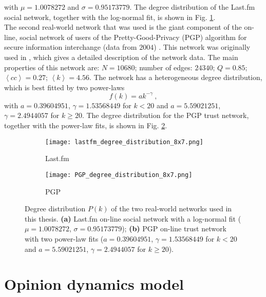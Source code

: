 \documentclass[11 pt , letterpaper , twoside , openright]{book}
\begin{document}
with $\mu = 1.0078272$ and $\sigma = 0.95173779$. The degree distribution of the Last.fm social network, together with the log-normal fit, is shown in Fig. \ref{deg_distr_lastfm}.\\
\newline
The second real-world network that was used is the giant component of the on-line, social network of users of the Pretty-Good-Privacy (PGP) algorithm for secure information interchange (data from $2004$) \cite{ICON}. This network was originally used in \cite{Boguna2004}, which gives a detailed description of the network data. The main properties of this network are: $N = 10680$; number of edges: $24340$; $Q = 0.85$; $\left<cc\right> = 0.27$; $\left<k\right> = 4.56$. The network has a heterogeneous degree distribution, which is best fitted by two power-laws
\begin{equation}
 f(k) = a k^{-\gamma} \ ,
\end{equation}
with $a = 0.39604951$, $\gamma = 1.53568449$ for $k < 20$ and $a = 5.59021251$, $\gamma = 2.4944057$ for $k \geqslant 20$. The degree distribution for the PGP trust network, together with the power-law fits, is shown in Fig. \ref{deg_distr_pgp}. 

\begin{figure}[H]
  \begin{subfigure}[b]{0.49\textwidth}
    \caption{Last.fm}
    \texttt{[image: lastfm\_degree\_distribution\_8x7.png]}
    \label{deg_distr_lastfm}
  \end{subfigure}
  \begin{subfigure}[b]{0.49\textwidth}
    \caption{PGP}
    \texttt{[image: PGP\_degree\_distribution\_8x7.png]}
    \label{deg_distr_pgp}
  \end{subfigure}
  \captionsetup{format=plain}
  \caption[Degree distribution $P(k)$ of the two real-world networks used in this thesis.]{Degree distribution $P(k)$ of the two real-world networks used in this thesis. \textbf{(a)} Last.fm on-line social network with a log-normal fit ($\mu = 1.0078272$, $\sigma = 0.95173779$); \textbf{(b)} PGP on-line trust network with two power-law fits ($a = 0.39604951$, $\gamma = 1.53568449$ for $k < 20$ and $a = 5.59021251$, $\gamma = 2.4944057$ for $k \geqslant 20$).}
\label{deg_distr_real_network}
\end{figure}

\section{Opinion dynamics model}\label{opinionmodel}
\end{document}
